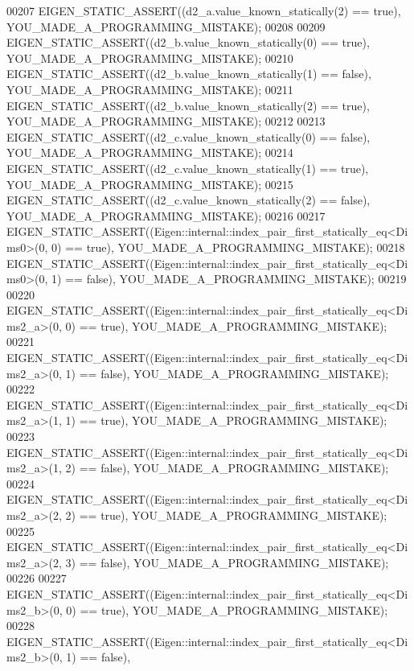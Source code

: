 \begin{DoxyCode}
00207   EIGEN\_STATIC\_ASSERT((d2\_a.value\_known\_statically(2) == \textcolor{keyword}{true}), YOU\_MADE\_A\_PROGRAMMING\_MISTAKE);
00208 
00209   EIGEN\_STATIC\_ASSERT((d2\_b.value\_known\_statically(0) == \textcolor{keyword}{true}), YOU\_MADE\_A\_PROGRAMMING\_MISTAKE);
00210   EIGEN\_STATIC\_ASSERT((d2\_b.value\_known\_statically(1) == \textcolor{keyword}{false}), YOU\_MADE\_A\_PROGRAMMING\_MISTAKE);
00211   EIGEN\_STATIC\_ASSERT((d2\_b.value\_known\_statically(2) == \textcolor{keyword}{true}), YOU\_MADE\_A\_PROGRAMMING\_MISTAKE);
00212 
00213   EIGEN\_STATIC\_ASSERT((d2\_c.value\_known\_statically(0) == \textcolor{keyword}{false}), YOU\_MADE\_A\_PROGRAMMING\_MISTAKE);
00214   EIGEN\_STATIC\_ASSERT((d2\_c.value\_known\_statically(1) == \textcolor{keyword}{true}), YOU\_MADE\_A\_PROGRAMMING\_MISTAKE);
00215   EIGEN\_STATIC\_ASSERT((d2\_c.value\_known\_statically(2) == \textcolor{keyword}{false}), YOU\_MADE\_A\_PROGRAMMING\_MISTAKE);
00216 
00217   EIGEN\_STATIC\_ASSERT((Eigen::internal::index\_pair\_first\_statically\_eq<Dims0>(0, 0) == \textcolor{keyword}{true}), 
      YOU\_MADE\_A\_PROGRAMMING\_MISTAKE);
00218   EIGEN\_STATIC\_ASSERT((Eigen::internal::index\_pair\_first\_statically\_eq<Dims0>(0, 1) == \textcolor{keyword}{false}), 
      YOU\_MADE\_A\_PROGRAMMING\_MISTAKE);
00219 
00220   EIGEN\_STATIC\_ASSERT((Eigen::internal::index\_pair\_first\_statically\_eq<Dims2\_a>(0, 0) == \textcolor{keyword}{true}), 
      YOU\_MADE\_A\_PROGRAMMING\_MISTAKE);
00221   EIGEN\_STATIC\_ASSERT((Eigen::internal::index\_pair\_first\_statically\_eq<Dims2\_a>(0, 1) == \textcolor{keyword}{false}), 
      YOU\_MADE\_A\_PROGRAMMING\_MISTAKE);
00222   EIGEN\_STATIC\_ASSERT((Eigen::internal::index\_pair\_first\_statically\_eq<Dims2\_a>(1, 1) == \textcolor{keyword}{true}), 
      YOU\_MADE\_A\_PROGRAMMING\_MISTAKE);
00223   EIGEN\_STATIC\_ASSERT((Eigen::internal::index\_pair\_first\_statically\_eq<Dims2\_a>(1, 2) == \textcolor{keyword}{false}), 
      YOU\_MADE\_A\_PROGRAMMING\_MISTAKE);
00224   EIGEN\_STATIC\_ASSERT((Eigen::internal::index\_pair\_first\_statically\_eq<Dims2\_a>(2, 2) == \textcolor{keyword}{true}), 
      YOU\_MADE\_A\_PROGRAMMING\_MISTAKE);
00225   EIGEN\_STATIC\_ASSERT((Eigen::internal::index\_pair\_first\_statically\_eq<Dims2\_a>(2, 3) == \textcolor{keyword}{false}), 
      YOU\_MADE\_A\_PROGRAMMING\_MISTAKE);
00226 
00227   EIGEN\_STATIC\_ASSERT((Eigen::internal::index\_pair\_first\_statically\_eq<Dims2\_b>(0, 0) == \textcolor{keyword}{true}), 
      YOU\_MADE\_A\_PROGRAMMING\_MISTAKE);
00228   EIGEN\_STATIC\_ASSERT((Eigen::internal::index\_pair\_first\_statically\_eq<Dims2\_b>(0, 1) == \textcolor{keyword}{false}), 

\end{DoxyCode}
